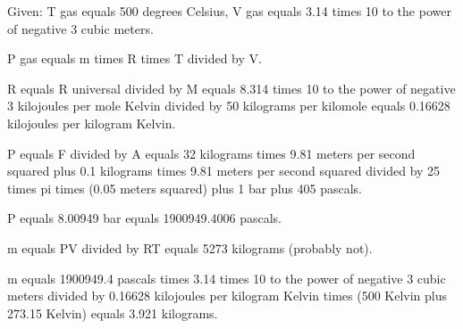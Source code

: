 Given: T gas equals 500 degrees Celsius, V gas equals 3.14 times 10 to the power of negative 3 cubic meters.  

P gas equals m times R times T divided by V.  

R equals R universal divided by M equals 8.314 times 10 to the power of negative 3 kilojoules per mole Kelvin divided by 50 kilograms per kilomole equals 0.16628 kilojoules per kilogram Kelvin.  

P equals F divided by A equals 32 kilograms times 9.81 meters per second squared plus 0.1 kilograms times 9.81 meters per second squared divided by 25 times pi times (0.05 meters squared) plus 1 bar plus 405 pascals.  

P equals 8.00949 bar equals 1900949.4006 pascals.  

m equals PV divided by RT equals 5273 kilograms (probably not).  

m equals 1900949.4 pascals times 3.14 times 10 to the power of negative 3 cubic meters divided by 0.16628 kilojoules per kilogram Kelvin times (500 Kelvin plus 273.15 Kelvin) equals 3.921 kilograms.